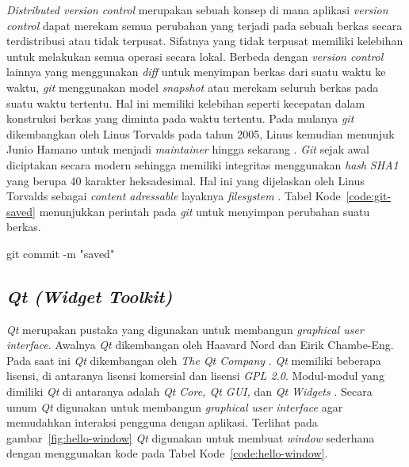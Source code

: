 \emph{Distributed version control} merupakan sebuah konsep di mana
aplikasi \emph{version control} dapat merekam semua perubahan yang
terjadi pada sebuah berkas secara terdistribusi atau tidak terpusat.
Sifatnya yang tidak terpusat memiliki kelebihan untuk melakukan semua
operasi secara lokal. Berbeda dengan \emph{version control} lainnya yang menggunakan \emph{diff}
untuk menyimpan berkas dari suatu waktu ke waktu, \emph{git} menggunakan
model \emph{snapshot} atau merekam seluruh berkas pada suatu waktu
tertentu. Hal ini memiliki kelebihan seperti kecepatan dalam
konstruksi berkas yang diminta pada waktu tertentu. Pada mulanya
\emph{git} dikembangkan oleh Linus Torvalds pada tahun 2005, Linus
kemudian menunjuk Junio Hamano untuk menjadi \emph{maintainer} hingga
sekarang \parencite{chacon2014pro}. \emph{Git} sejak awal diciptakan
secara modern sehingga memiliki integritas menggunakan \emph{hash}
\emph{SHA1} yang berupa 40 karakter heksadesimal. Hal ini yang
dijelaskan oleh Linus Torvalds sebagai \emph{content adressable}
layaknya \emph{filesystem} \parencite{gitmail1}. Tabel Kode~\ref{code:git-saved}
menunjukkan perintah pada \emph{git} untuk menyimpan perubahan suatu
berkas.

\par\null\par
\begin{code}
\begin{ignasicblock}[title=commit,minted language=text]
git commit -m "saved"
\end{ignasicblock}
  \label{code:git-saved}
\end{code}

\subsection{\emph{Qt (Widget Toolkit)}}

\emph{Qt} merupakan pustaka yang digunakan untuk membangun
\emph{graphical user interface}. Awalnya \emph{Qt} dikembangan oleh
Haavard Nord dan Eirik Chambe-Eng. Pada saat ini \emph{Qt}
dikembangan oleh \emph{The Qt Company} \parencite{qthistory}.
\emph{Qt} memiliki beberapa lisensi, di antaranya lisensi komersial dan
lisensi \emph{GPL 2.0}. Modul-modul yang dimiliki \emph{Qt} di antaranya adalah
\emph{Qt Core, Qt GUI,} dan \emph{Qt Widgets}
\parencite{qtabout}. Secara umum \emph{Qt} digunakan untuk
membangun \emph{graphical user interface} agar memudahkan interaksi
pengguna dengan aplikasi. Terlihat pada gambar~\ref{fig:hello-window} \emph{Qt} digunakan
untuk membuat \emph{window} sederhana dengan menggunakan kode pada
Tabel Kode~\ref{code:hello-window}.

